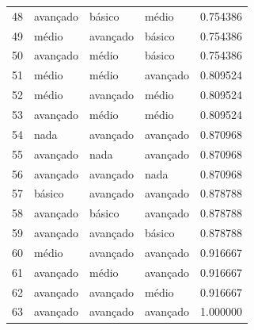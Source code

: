 \documentclass[]{article}
\begin{document}
\begin{longtable}{|llll|r|}
		48 & avançado & básico   & médio    & 0.754386     \\
		49 & médio    & avançado & básico   & 0.754386     \\
		50 & avançado & médio    & básico   & 0.754386     \\
		51 & médio    & médio    & avançado & 0.809524     \\
		52 & médio    & avançado & médio    & 0.809524     \\
		53 & avançado & médio    & médio    & 0.809524     \\
		54 & nada      & avançado & avançado & 0.870968     \\
		55 & avançado & nada      & avançado & 0.870968     \\
		56 & avançado & avançado & nada      & 0.870968     \\
		57 & básico   & avançado & avançado & 0.878788     \\
		58 & avançado & básico   & avançado & 0.878788     \\
		59 & avançado & avançado & básico   & 0.878788     \\
		60 & médio    & avançado & avançado & 0.916667     \\
		61 & avançado & médio    & avançado & 0.916667     \\
		62 & avançado & avançado & médio    & 0.916667     \\
		63 & avançado & avançado & avançado & 1.000000     \\
		\hline
	\end{longtable}
	
	
	
\end{document}
